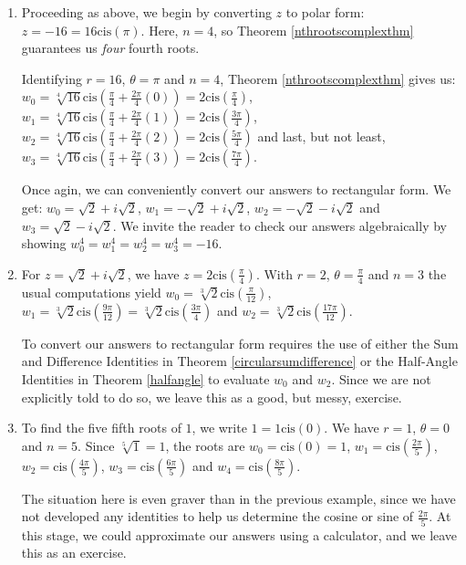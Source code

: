 \documentclass{ximera}
\begin{document}
\begin{example}
\begin{explanation}
\begin{enumerate}
\item  Proceeding as above, we begin by converting $z$ to polar form: $z = -16 = 16 \text{cis}(\pi)$.  Here, $n = 4$, so Theorem \ref{nthrootscomplexthm} guarantees  us \textit{four} fourth roots.

 

Identifying $r = 16$, $\theta = \pi$ and $n = 4$,  Theorem \ref{nthrootscomplexthm} gives us:  $w_0 = \sqrt[4]{16} \text{cis}\left(\frac{\pi}{4} + \frac{2\pi}{4} (0)\right) = 2\text{cis}\left(\frac{\pi}{4}\right)$, $w_1 = \sqrt[4]{16} \text{cis}\left(\frac{\pi}{4} + \frac{2\pi}{4} (1)\right) = 2\text{cis}\left(\frac{3\pi}{4}\right)$, $w_2 = \sqrt[4]{16} \text{cis}\left(\frac{\pi}{4} + \frac{2\pi}{4} (2)\right) = 2\text{cis}\left(\frac{5\pi}{4}\right)$ and last, but not least,  $w_3 = \sqrt[4]{16} \text{cis}\left(\frac{\pi}{4} + \frac{2\pi}{4} (3)\right) = 2\text{cis}\left(\frac{7\pi}{4}\right)$.  

 

Once agin, we can conveniently convert our answers to rectangular form. We get:  $w_0 = \sqrt{2} + i\sqrt{2}$,  $w_1 = -\sqrt{2} + i\sqrt{2}$,  $w_2 = -\sqrt{2} - i\sqrt{2}$ and  $w_3 = \sqrt{2} - i\sqrt{2}$.  We invite the reader to check  our answers algebraically by showing  $w_0^{4} = w_1 ^{4} = w_2^{4}  = w_3^{4} = -16$.

\item  For $z = \sqrt{2} + i \sqrt{2}$, we have $z = 2\text{cis}\left(\frac{\pi}{4}\right)$.  With $r = 2$, $\theta = \frac{\pi}{4}$ and $n =3$ the usual computations yield $w_0 = \sqrt[3]{2} \text{cis}\left(\frac{\pi}{12}\right)$,  $w_1 = \sqrt[3]{2} \text{cis}\left(\frac{9\pi}{12}\right) = \sqrt[3]{2} \text{cis}\left(\frac{3\pi}{4}\right) $ and  $w_2 = \sqrt[3]{2} \text{cis}\left(\frac{17\pi}{12}\right)$. 

 

 To  convert our answers to rectangular form requires the use of  either the Sum and Difference Identities in Theorem \ref{circularsumdifference} or the Half-Angle Identities in Theorem \ref{halfangle} to evaluate $w_0$ and  $w_2$.  Since we are not explicitly told to do so, we leave this as a good, but messy, exercise.

\item  To find the five fifth roots of $1$, we write $1 = 1 \text{cis}(0)$.  We have $r = 1$, $\theta = 0$ and $n = 5$. Since $\sqrt[5]{1} = 1$, the roots are  $w_0 = \text{cis}(0) = 1$, $w_1 = \text{cis}\left(\frac{2\pi}{5}\right)$, $w_2 = \text{cis}\left(\frac{4\pi}{5}\right)$, $w_3 = \text{cis}\left(\frac{6\pi}{5}\right)$ and $w_4 = \text{cis}\left(\frac{8\pi}{5}\right)$. 

 

 The situation here is even graver than in the previous example, since we have not developed any identities to help us determine the cosine or sine of $\frac{2\pi}{5}$.  At this stage, we could approximate our answers using a calculator, and we leave this as an exercise. 

\end{enumerate}
\end{explanation}
\end{example}
\end{document}
